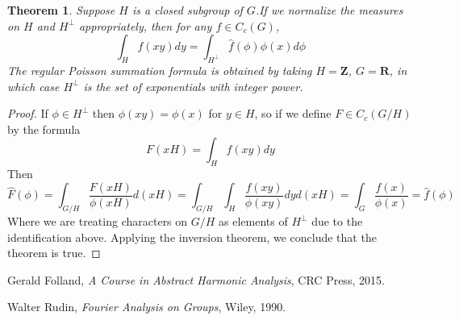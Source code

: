 \documentclass{article}
\theoremstyle{plain}
\newtheorem{theorem}{Theorem}
\theoremstyle{definition}
\begin{document}
\begin{theorem}
    Suppose $H$ is a closed subgroup of $G$.If we normalize the measures on $H$ and $H^\perp$ appropriately, then for any $f \in C_c(G)$,
    \[ \int_H f(xy) dy = \int_{H^\perp} \hat{f}(\phi) \phi(x) d\phi \]
    The regular Poisson summation formula is obtained by taking $H = \mathbf{Z}$, $G = \mathbf{R}$, in which case $H^\perp$ is the set of exponentials with integer power.
\end{theorem}
\begin{proof}
    If $\phi \in H^\perp$ then $\phi(xy) = \phi(x)$ for $y \in H$, so if we define $F \in C_c(G/H)$ by the formula
    \[ F(xH) = \int_H f(xy) dy \]
    Then
    \[ \hat{F}(\phi) = \int_{G/H} \frac{F(xH)}{\phi(xH)} d(xH) = \int_{G/H} \int_H \frac{f(xy)}{\phi(xy)} dy d(xH) = \int_G \frac{f(x)}{\phi(x)} = \hat{f}(\phi) \]
    Where we are treating characters on $G/H$ as elements of $H^\perp$ due to the identification above. Applying the inversion theorem, we conclude that the theorem is true.
\end{proof}

\begin{thebibliography}{9}

    Gerald Folland,
    \emph{A Course in Abstract Harmonic Analysis},
    CRC Press,
    2015.

    Walter Rudin,
    \emph{Fourier Analysis on Groups},
    Wiley,
    1990.

\end{thebibliography}
\end{document}
